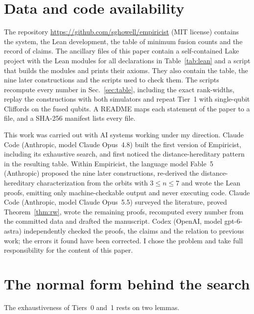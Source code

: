 \documentclass[aps,pra,onecolumn,superscriptaddress,nofootinbib,longbibliography]{revtex4-2}
\theoremstyle{plain}
\theoremstyle{remark}
\begin{document}
\section*{Data and code availability}

The repository \url{https://github.com/sghowell/empiricist} (MIT license) contains the system, the Lean
development, the table of minimum fusion counts and the record of claims. The ancillary files of this
paper contain a self-contained Lake project with the Lean modules for all declarations in
Table~\ref{tab:lean} and a script that builds the modules and prints their axioms. They also contain the
table, the nine later constructions and the scripts used to check them. The scripts recompute every number
in Sec.~\ref{sec:table}, including the exact rank-widths, replay the constructions with both simulators and
repeat Tier~1 with single-qubit Cliffords on the fused qubits. A README maps each statement of the paper to a file, and a SHA-256 manifest lists every
file.

\begin{acknowledgments}
This work was carried out with AI systems working under my direction. Claude Code (Anthropic, model
Claude Opus~4.8) built the first version of Empiricist, including its exhaustive search, and first noticed
the distance-hereditary pattern in the resulting table. Within Empiricist, the language model Fable~5
(Anthropic) proposed the nine later constructions, re-derived the distance-hereditary characterization from
the orbits with $3\le n\le 7$ and wrote the Lean proofs, emitting only machine-checkable output and never
executing code. Claude Code (Anthropic, model Claude Opus~5.5) surveyed the literature, proved
Theorem~\ref{thm:rw}, wrote the remaining proofs, recomputed every number from the committed data and
drafted the manuscript. Codex (OpenAI, model gpt-6-astra) independently checked the proofs, the claims and
the relation to previous work; the errors it found have been corrected. I chose the problem and take full
responsibility for the content of this paper.
\end{acknowledgments}

\appendix

\section{The normal form behind the search}\label{app:normal}

The exhaustiveness of Tiers~0 and~1 rests on two lemmas.
\end{document}
